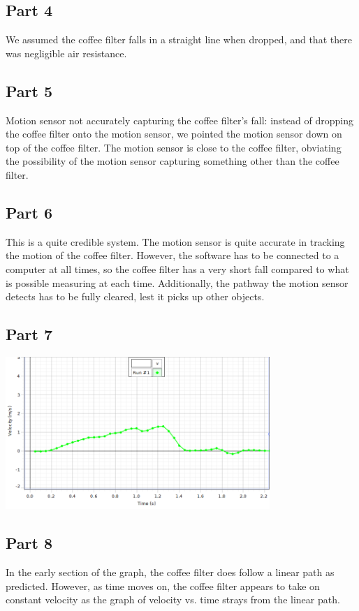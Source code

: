 \documentclass[8pt]{extarticle}
\begin{document}
{\subsection*{Part 4}
We assumed the coffee filter falls in a straight line when dropped, and that there was negligible air resistance.
\subsection*{Part 5}
Motion sensor not accurately capturing the coffee filter's fall: instead of dropping the coffee filter onto the motion sensor, we pointed the motion sensor down on top of the coffee filter. The motion sensor is close to the coffee filter, obviating the possibility of the motion sensor capturing something other than the coffee filter.
\subsection*{Part 6}
This is a quite credible system. The motion sensor is quite accurate in tracking the motion of the coffee filter. However, the software has to be connected to a computer at all times, so the coffee filter has a very short fall compared to what is possible measuring at each time. Additionally, the pathway the motion sensor detects has to be fully cleared, lest it picks up other objects.
\subsection*{Part 7}
\begin{center}
	\includegraphics[width=10cm]{images/Lab6Image2_1.png}
\end{center}
\subsection*{Part 8}
In the early section of the graph, the coffee filter does follow a linear path as predicted. However, as time moves on, the coffee filter appears to take on constant velocity as the graph of velocity vs. time strays from the linear path.
}
\end{document}
